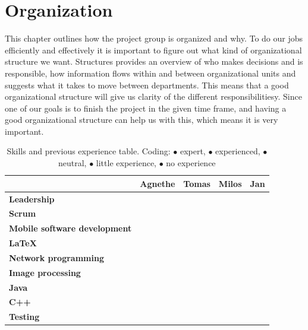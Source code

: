\section{Organization}
This chapter outlines how the project group is organized and why.
To do our jobs efficiently and effectively it is important to figure out what kind of organizational structure we want. 
Structures provides an overview of who makes decisions and is responsible, how information flows within and between organizational units and suggests what it takes to move between departments. This means that a good organizational structure will give us clarity of the different responsibilitiesy. Since one of our goals is to finish the project in the given time frame, and having a good organizational structure can help us with this, which means it is very important.

\begin{table}\centering {}
    \caption{Skills and previous experience table. Coding:
        \textcolor{green!100}{$\bullet$} expert,
        \textcolor{green!60}{$\bullet$} experienced,
        \textcolor{yellow!75}{$\bullet$} neutral,
        \textcolor{orange!90}{$\bullet$} little experience,
        \textcolor{red!80}{$\bullet$} no experience}
    \label{tab:skills}
    \vspace{2mm}
    \begin{tabular}{lcccc}
    \toprule
                                & Agnethe   & Tomas & Milos & Jan \\
    \midrule
    \textbf{Leadership                 } &  &  &  &  \\ 
    \textbf{Scrum                      } &  &  &  &  \\ 
    \textbf{Mobile software development} &  &  &  &  \\ 
    \textbf{\LaTeX                     } &  &  &  &  \\ 
    \textbf{Network programming        } &  &  &  &  \\ 
    \textbf{Image processing           } &  &  &  &  \\ 
    \textbf{Java                       } &  &  &  &  \\ 
    \textbf{C++                        } &  &  &  &  \\ 
    \textbf{Testing                    } &  &  &  &  \\
    \bottomrule
    \end{tabular}
\end{table}

